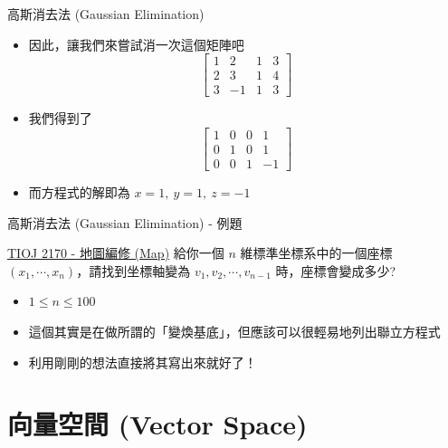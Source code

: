 \documentclass[aspectratio=169]{beamer}
\begin{document}
    \begin{frame}{高斯消去法 (Gaussian Elimination)}
        \begin{itemize}
            \item 因此，讓我們來嘗試消一次這個矩陣吧
            $$\begin{bmatrix}1 & 2 & 1 & 3 \\ 2 & 3 & 1 & 4 \\ 3 & -1 & 1 & 3\end{bmatrix}$$
            \item<2-> 我們得到了
            $$\begin{bmatrix}1 & 0 & 0 & 1 \\ 0 & 1 & 0 & 1 \\ 0 & 0 & 1 & -1\end{bmatrix}$$
            \item<2-> 而方程式的解即為 $x = 1, \ y = 1, \ z = -1$
        \end{itemize} 
    \end{frame}
    
    \begin{frame}{高斯消去法 (Gaussian Elimination) - 例題}
        \begin{block}{\href{https://tioj.ck.tp.edu.tw/problems/2170}{TIOJ 2170 - 地圖編修 (Map)}}
            給你一個 $n$ 維標準坐標系中的一個座標 $(x_1,\cdots,x_n)$，請找到坐標軸變為 $v_1,v_2,\cdots,v_{n-1}$ 時，座標會變成多少?
            \begin{itemize}
                \item $1 \le n \le 100$
            \end{itemize}
        \end{block}
        \begin{itemize}
            \item<2-> 這個其實是在做所謂的「變煥基底」，但應該可以很輕易地列出聯立方程式
            \item<2-> 利用剛剛的想法直接將其寫出來就好了！
        \end{itemize}
    \end{frame}
    
    \section{向量空間 (Vector Space)}
    
\end{document}
